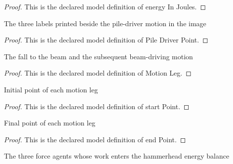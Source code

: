\begin{proof}
  This is the declared model definition of energy In Joules.
\end{proof}
\begin{definition}
  \label{def:physics:phyx-mini-0808:phyxminiproblems-problemphyxmini0808-piledriverpoint}
  The three labels printed beside the pile-driver motion in the image
\end{definition}
\begin{proof}
  This is the declared model definition of Pile Driver Point.
\end{proof}
\begin{definition}
  \label{def:physics:phyx-mini-0808:phyxminiproblems-problemphyxmini0808-motionleg}
  The fall to the beam and the subsequent beam-driving motion
\end{definition}
\begin{proof}
  This is the declared model definition of Motion Leg.
\end{proof}
\begin{definition}
  \label{def:physics:phyx-mini-0808:phyxminiproblems-problemphyxmini0808-motionleg-startpoint}
  Initial point of each motion leg
\end{definition}
\begin{proof}
  This is the declared model definition of start Point.
\end{proof}
\begin{definition}
  \label{def:physics:phyx-mini-0808:phyxminiproblems-problemphyxmini0808-motionleg-endpoint}
  Final point of each motion leg
\end{definition}
\begin{proof}
  This is the declared model definition of end Point.
\end{proof}
\begin{definition}
  \label{def:physics:phyx-mini-0808:phyxminiproblems-problemphyxmini0808-forcesource}
  The three force agents whose work enters the hammerhead energy balance
\end{definition}
